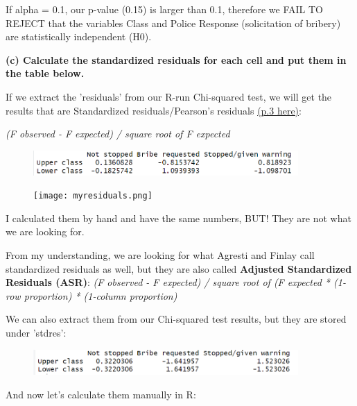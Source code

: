 \documentclass[12pt,letterpaper]{article}
\begin{document}
\begin{enumerate}
If alpha = 0.1, our p-value (0.15) is larger than 0.1, therefore we FAIL TO REJECT that the variables Class and Police Response (solicitation of bribery) are statistically independent (H0).

 \textbf{(c) Calculate the standardized residuals for each cell and put them in the table below.}
\vspace{0.2cm}

If we extract the 'residuals' from our R-run Chi-squared test, 
we will get the results that are Standardized residuals/Pearson's residuals \href{https://scholarworks.umass.edu/cgi/viewcontent.cgi?article=1269&context=pare#:~:text=There%20are%20at%20least%20four,the%20chi%2Dsquare%20test%20result}{(p.3 here)}: 

\textit{(F observed - F expected) / square root of F expected}
		  
	
	\begin{figure}[h!]
		\centering
		\label{fig:residuals}
		\includegraphics[width=0.9\textwidth]{residuals.png}
	\end{figure}
	
		\begin{figure}[h!]
		\centering
		\label{fig:myresiduals}
		\texttt{[image: myresiduals.png]}
	\end{figure}				
	
I calculated them by hand and have the same numbers, BUT! 
They are not what we are looking for.

From my understanding, we are looking for what Agresti and Finlay call standardized residuals as well, but they are also called \textbf {Adjusted Standardized Residuals (ASR)}: \textit {(F observed - F expected) / square root of (F expected * (1-row proportion) * (1-column proportion)}


We can also extract them from our Chi-squared test results, but they are stored under 'stdres':
	  
	
		\begin{figure}[h!]
		\centering
		\label{fig:stdres}
		\includegraphics[width=0.9\textwidth]{stdres.png}
	\end{figure}		
\begin{flushleft}
	And now let's calculate them manually in R:
\end{flushleft}


\end{enumerate}
\end{document}
